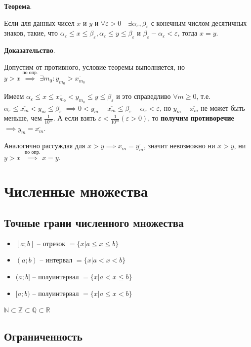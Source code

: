 \documentclass{article}
\newcommand{\bydef}{\stackrel{\text{по опр.}}{\implies}} %
\theoremstyle{break}
\begin{document}
\textbf{Теорема}.

Если для данных чисел $x$ и $y$ и 
$\forall \varepsilon > 0 \quad \exists \alpha_{\varepsilon}, \beta_{\varepsilon}$
с конечным числом десятичных знаков, такие, что
$\alpha_{\varepsilon} \le x \le \beta_{\varepsilon}, \alpha_{\varepsilon} \le y \le \beta_{\varepsilon}$
и $\beta_{\varepsilon} - \alpha_{\varepsilon} < \varepsilon$, тогда $x = y$.

\textbf{Доказательство}.

Допустим от противного, условие теоремы выполняется, но 
$y > x \bydef \exists m_0: y_{m_0} > \overline{x_{m_0}}$

Имеем $\alpha_{\varepsilon} \le x \le \overline{x_{m_0}} < y_{m_0} \le y \le \beta_{\varepsilon}$
и это справедливо $\forall m \ge 0$, т.е. 
$\alpha_{\varepsilon} \le \overline{x_m} < y_m \le \beta_{\varepsilon}$
$\implies 0 < y_m - \overline{x_m} \le \beta_\varepsilon - \alpha_\varepsilon < \varepsilon$,
но $y_m - \overline{x_m}$ не может быть меньше, чем $\frac{1}{10^m}$. А если взять
$\varepsilon < \frac{1}{10^m} (\varepsilon > 0)$, то \textbf{получим противоречие}
$\implies y_m = \overline{x_m}$.

Аналогично рассуждая для $x > y \implies x_m = \overline{y_m}$, значит невозможно
ни $x > y$, ни $y > x$ $\bydef x = y$.

\section{Численные множества}

\subsection{Точные грани численного множества}

\begin{itemize}
    \item $[a;b]$ -- отрезок $= \{x | a \le x \le b\}$
    \item $(a;b)$ -- интервал $= \{x | a < x < b\}$
    \item $(a;b]$ -- полуинтервал $= \{x | a < x \le b\}$
    \item $[a;b)$ -- полуинтервал $= \{x | a \le x < b\}$
\end{itemize}

$\mathbb{N} \subset \mathbb{Z} \subset \mathbb{Q} \subset \mathbb{R}$

\subsection{Ограниченность}
\end{document}

